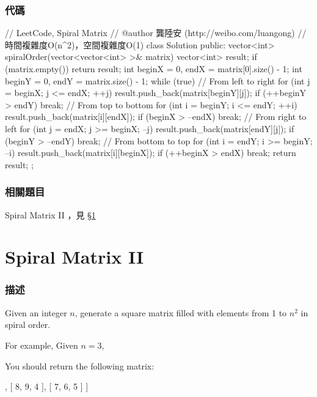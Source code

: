 \subsubsection{代碼}
\begin{Code}
// LeetCode, Spiral Matrix
// @author 龔陸安 (http://weibo.com/luangong)
// 時間複雜度O(n^2)，空間複雜度O(1)
class Solution {
public:
    vector<int> spiralOrder(vector<vector<int> >& matrix) {
        vector<int> result;
        if (matrix.empty()) return result;
        int beginX = 0, endX = matrix[0].size() - 1;
        int beginY = 0, endY = matrix.size() - 1;
        while (true) {
            // From left to right
            for (int j = beginX; j <= endX; ++j) result.push_back(matrix[beginY][j]);
            if (++beginY > endY) break;
            // From top to bottom
            for (int i = beginY; i <= endY; ++i) result.push_back(matrix[i][endX]);
            if (beginX > --endX) break;
            // From right to left
            for (int j = endX; j >= beginX; --j) result.push_back(matrix[endY][j]);
            if (beginY > --endY) break;
            // From bottom to top
            for (int i = endY; i >= beginY; --i) result.push_back(matrix[i][beginX]);
            if (++beginX > endX) break;
        }
        return result;
    }
};
\end{Code}


\subsubsection{相關題目}
\begindot
\item Spiral Matrix II ，見 \S \ref{sec:spiral-matrix-ii}
\myenddot


\section{Spiral Matrix II} %
\label{sec:spiral-matrix-ii}


\subsubsection{描述}
Given an integer $n$, generate a square matrix filled with elements from 1 to $n^2$ in spiral order.

For example,
Given $n = 3$,

You should return the following matrix:
\begin{Code}
[
 [ 1, 2, 3 ],
 [ 8, 9, 4 ],
 [ 7, 6, 5 ]
]
\end{Code}


